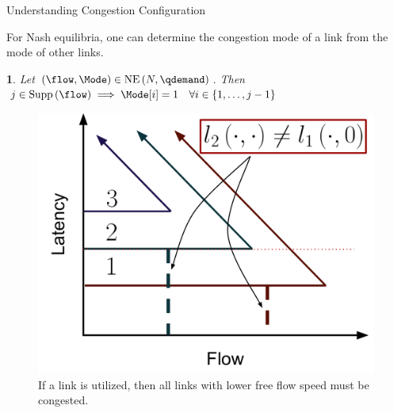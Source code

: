 \documentclass[english, smaller]{beamer}
\theoremstyle{plain}
\theoremstyle{definition}
\theoremstyle{plain}
\newtheorem{lem}[thm]{\protect\lemmaname}
\theoremstyle{plain}
\providecommand{\lemmaname}{Lemma}
\begin{document}
\begin{frame}{Understanding Congestion Configuration}

For Nash equilibria, one can determine the congestion mode of a link
from the mode of other links.
\begin{lem}
\label{lem:filluplower}Let $\left(\flow,\Mode\right)\in\NashEquilibrium{\NLinks}{\qdemand}$.
Then $j\in\Supp{\flow}\implies\Mode[i]=1\quad\forall i\in\left\{ 1,\ldots,j-1\right\} $


\end{lem}
\begin{figure}
\begin{centering}
\includegraphics[scale=0.25]{../../figures/presentation/LemmaLowerIndexLinksCongested}
\par\end{centering}

\caption{If a link is utilized, then all links with lower free flow speed must
be congested.}
\end{figure}



\end{frame}
\end{document}
